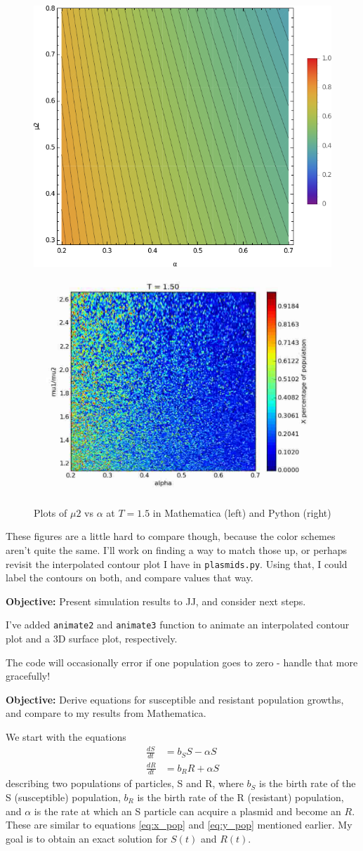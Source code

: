 \documentclass[oneside]{labbook}
\newcommand{\obj}[1]{\textbf{Objective:} #1}
\begin{document}
\begin{figure}[h!]
\includegraphics[width=.5\columnwidth]{mathematica_T1_5.pdf}
\includegraphics[width=.5\columnwidth]{python_T1_5.pdf}
\caption{Plots of $\mu2$ vs $\alpha$ at $T=1.5$ in Mathematica (left) and Python (right)}
\end{figure}

These figures are a little hard to compare though, because the color schemes
aren't quite the same. I'll work on finding a way to match those up, or perhaps
revisit the interpolated contour plot I have in \texttt{plasmids.py}. Using that,
I could label the contours on both, and compare values that way.



\obj{Present simulation results to JJ, and consider next steps.}

I've added \texttt{animate2} and \texttt{animate3} function to animate an
interpolated contour plot and a 3D surface plot, respectively.

The code will occasionally error if one population goes to zero - handle that
more gracefully!


\obj{Derive equations for susceptible and resistant population growths, and
compare to my results from Mathematica.}

We start with the equations
\begin{align}
  \frac{dS}{dt} & = b_S S - \alpha S \label{eq:S_growth}\\
  \frac{dR}{dt} & = b_R R + \alpha S \label{eq:R_growth}
\end{align}
describing two populations of particles, S and R, where $b_S$ is the birth rate
of the S (susceptible) population, $b_R$ is the birth rate of the R (resistant)
population, and $\alpha$ is the rate at which an S particle can acquire a plasmid
and become an $R$. These are similar to equations
\eqref{eq:x_pop} and \eqref{eq:y_pop} mentioned earlier. My goal is to obtain an
exact solution for $S(t)$ and $R(t)$.
\end{document}
